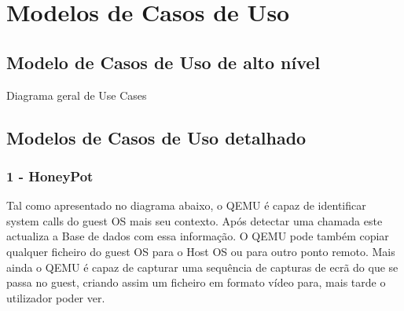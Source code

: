 \section{Modelos de Casos de Uso}
\subsection{Modelo de Casos de Uso de alto nível}

Diagrama geral de Use Cases

\subsection{Modelos de Casos de Uso detalhado}


\subsubsection{\textbf{1 - HoneyPot}}

Tal como apresentado no diagrama abaixo, o QEMU é capaz de identificar system calls do guest OS mais seu contexto. Após detectar uma chamada este
actualiza a Base de dados com essa informação. O QEMU pode também copiar qualquer ficheiro do guest OS para o Host OS ou para outro ponto remoto.
Mais ainda o QEMU é capaz de capturar uma sequência de capturas de ecrã do que se passa no guest, criando assim um ficheiro em formato vídeo para, 
mais tarde o utilizador poder ver.

